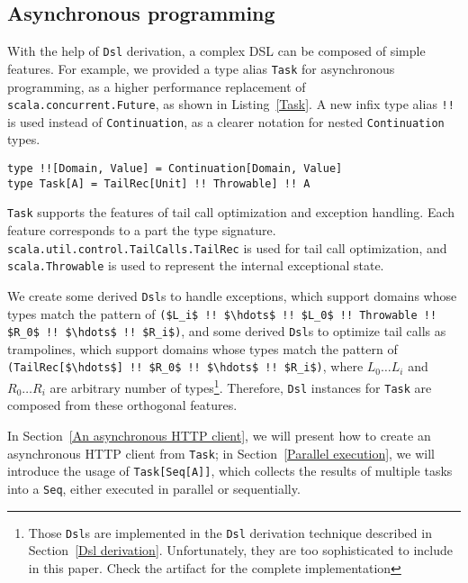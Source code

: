 \subsection{Asynchronous programming}\label{Asynchronous programming}

With the help of \lstinline{Dsl} derivation, a complex DSL can be composed of simple features. For example, we provided a type alias \lstinline{Task} for asynchronous programming, as a higher performance replacement of \lstinline{scala.concurrent.Future}, as shown in Listing~\ref{Task}. A new infix type alias \lstinline{!!} is used instead of \lstinline{Continuation}, as a clearer notation for nested \lstinline{Continuation} types.
\begin{lstlisting}[caption={The definition of asynchronous \lstinline{Task}},label={Task}]
type !![Domain, Value] = Continuation[Domain, Value]
type Task[A] = TailRec[Unit] !! Throwable] !! A
\end{lstlisting}

\lstinline{Task} supports the features of tail call optimization and exception handling. Each feature corresponds to a part the type signature. \lstinline{scala.util.control.TailCalls.TailRec} is used for tail call optimization, and \lstinline{scala.Throwable} is used to represent the internal exceptional state.

We create some derived \lstinline{Dsl}s to handle exceptions, which support domains whose types match the pattern of \lstinline[mathescape=true]{($L_i$ !! $\hdots$ !! $L_0$ !! Throwable !! $R_0$ !! $\hdots$ !! $R_i$)}, and some derived \lstinline{Dsl}s to optimize tail calls as trampolines, which support domains whose types match the pattern of \lstinline[mathescape=true]{(TailRec[$\hdots$] !! $R_0$ !! $\hdots$ !! $R_i$)}, where $L_0 \hdots L_i$ and $R_0 \hdots R_i$ are arbitrary number of types\footnote{Those \lstinline{Dsl}s are implemented in the \lstinline{Dsl} derivation technique described in Section~\ref{Dsl derivation}. Unfortunately, they are too sophisticated to include in this paper. Check the artifact for the complete implementation}. Therefore, \lstinline{Dsl} instances for \lstinline{Task} are composed from these orthogonal features.

In Section~\ref{An asynchronous HTTP client}, we will present how to create an asynchronous HTTP client from \lstinline{Task}; in  Section~\ref{Parallel execution}, we will introduce the usage of \lstinline{Task[Seq[A]]}, which collects the results of multiple tasks into a \lstinline{Seq}, either executed in parallel or sequentially.


